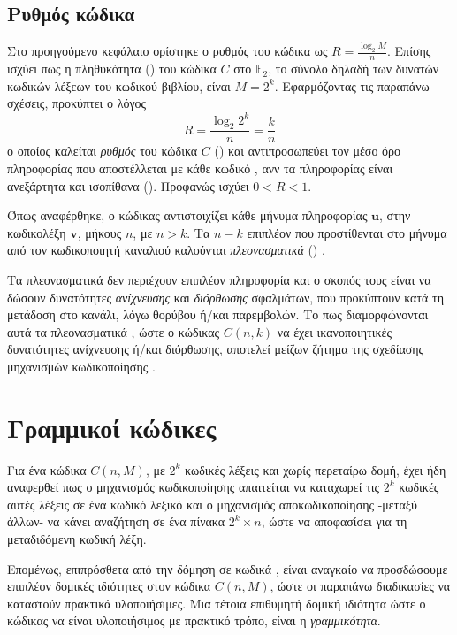 \subsection{Ρυθμός κώδικα}
Στο προηγούμενο κεφάλαιο ορίστηκε ο ρυθμός του κώδικα ως $R=\frac{\log_{2}M}{n}$. Επίσης ισχύει πως η πληθυκότητα () του  κώδικα $C$ στο $\mathbb{F}_2$, το σύνολο δηλαδή των δυνατών κωδικών λέξεων του κωδικού βιβλίου, είναι $M=2^k$. Εφαρμόζοντας τις παραπάνω σχέσεις, προκύπτει ο λόγος
\begin{equation}
R = \frac{\log_{2}2^{k}}{n} = \frac{k}{n}
\label{eq:code rate}
\end{equation}
ο οποίος καλείται \textit{ρυθμός} του  κώδικα $C$ () και αντιπροσωπεύει τον μέσο όρο πληροφορίας που αποστέλλεται με κάθε κωδικό , ανν τα  πληροφορίας είναι ανεξάρτητα και ισοπίθανα (). Προφανώς ισχύει $0<R<1$.

\vspace{5mm}

Όπως αναφέρθηκε, ο κώδικας αντιστοιχίζει κάθε μήνυμα πληροφορίας $\mathbf{u}$, στην κωδικολέξη $\mathbf{v}$, μήκους $n$, με $n>k$. Tα $n-k$ επιπλέον  που προστίθενται στο μήνυμα από τον κωδικοποιητή καναλιού καλούνται \textit{πλεονασματικά} () .

Τα πλεονασματικά  δεν περιέχουν επιπλέον πληροφορία και ο σκοπός τους είναι να δώσουν δυνατότητες \textit{ανίχνευσης} και \textit{διόρθωσης} σφαλμάτων, που προκύπτουν κατά τη μετάδοση στο κανάλι, λόγω θορύβου ή/και παρεμβολών. Το πως διαμορφώνονται αυτά τα πλεονασματικά , ώστε ο  κώδικας $C(n,k)$ να έχει ικανοποιητικές δυνατότητες ανίχνευσης ή/και διόρθωσης, αποτελεί μείζων ζήτημα της σχεδίασης μηχανισμών κωδικοποίησης \cite{ryan2009channel}.

\section{Γραμμικοί  κώδικες}
Για ένα  κώδικα $C(n,M)$, με $2^k$ κωδικές λέξεις και χωρίς περεταίρω δομή, έχει ήδη αναφερθεί πως ο μηχανισμός κωδικοποίησης απαιτείται να καταχωρεί τις $2^k$ κωδικές αυτές λέξεις σε ένα κωδικό λεξικό και ο μηχανισμός αποκωδικοποίησης -μεταξύ άλλων- να κάνει αναζήτηση σε ένα πίνακα $2^k\times{n}$, ώστε να αποφασίσει για τη μεταδιδόμενη κωδική λέξη.

Επομένως, επιπρόσθετα από την δόμηση σε κωδικά , είναι αναγκαίο να προσδώσουμε επιπλέον δομικές ιδιότητες στον κώδικα $C(n,M)$, ώστε οι παραπάνω διαδικασίες να καταστούν πρακτικά υλοποιήσιμες. Μια τέτοια επιθυμητή δομική ιδιότητα ώστε ο  κώδικας να είναι υλοποιήσιμος με πρακτικό τρόπο, είναι η \textit{γραμμικότητα}.

